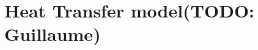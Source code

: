 \documentclass[a4paper,11pt]{book}
\newcommand{\todo}[1]{({\small\color{red}\textbf{TODO: }\textbf{#1}})}
\begin{document}
\section{Heat Transfer model\todo{Guillaume}}





\end{document}
